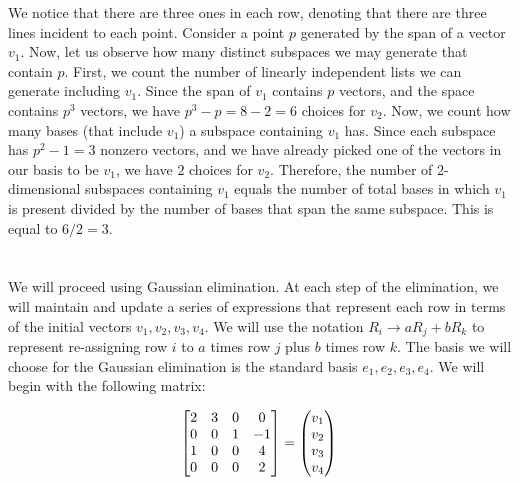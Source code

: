 \documentclass{article}
\begin{document}
We notice that there are three ones in each row, denoting that there are three lines incident to each point. Consider a point $p$ generated by the span of a vector $v_1$. Now, let us observe how many distinct subspaces we may generate that contain $p$. First, we count the number of linearly independent lists we can generate including $v_1$. Since the span of $v_1$ contains $p$ vectors, and the space contains $p^3$ vectors, we have $p^3 - p = 8 - 2 = 6$ choices for $v_2$. Now, we count how many bases (that include $v_1$) a subspace containing $v_1$ has. Since each subspace has $p^2 - 1 = 3$ nonzero vectors, and we have already picked one of the vectors in our basis to be $v_1$, we have $2$ choices for $v_2$. Therefore, the number of 2-dimensional subspaces containing $v_1$ equals the number of total bases in which $v_1$ is present divided by the number of bases that span the same subspace. This is equal to $6/2 = 3$.


\newpage
\section{}

We will proceed using Gaussian elimination. At each step of the elimination, we will maintain and update a series of expressions that represent each row in terms of the initial vectors $v_1, v_2, v_3, v_4$. We will use the notation $R_i \to aR_j + bR_k$ to represent re-assigning row $i$ to $a$ times row $j$ plus $b$ times row $k$. The basis we will choose for the Gaussian elimination is the standard basis $e_1, e_2, e_3, e_4$. We will begin with the following matrix:

\[
    \begin{bmatrix}
        2 & 3 & 0 & 0  \\
        0 & 0 & 1 & -1 \\
        1 & 0 & 0 & 4  \\
        0 & 0 & 0 & 2
    \end{bmatrix} = \begin{pmatrix}
        v_1 \\v_2\\v_3\\v_4
    \end{pmatrix}\\
\]
\end{document}
